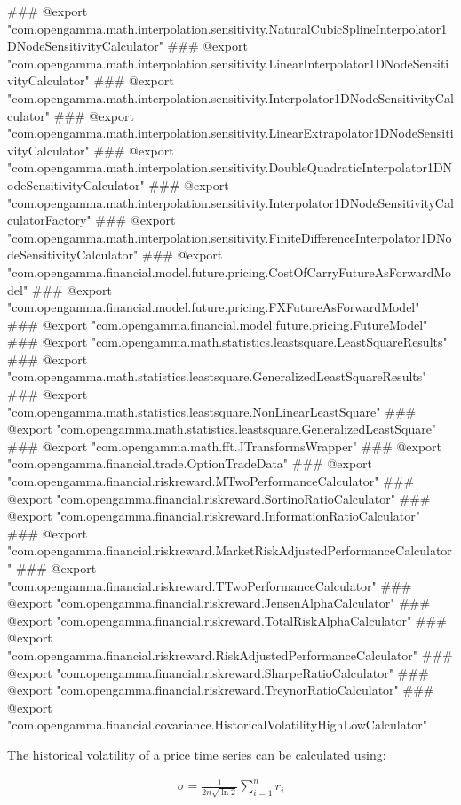 ### @export "com.opengamma.math.interpolation.sensitivity.NaturalCubicSplineInterpolator1DNodeSensitivityCalculator"
### @export "com.opengamma.math.interpolation.sensitivity.LinearInterpolator1DNodeSensitivityCalculator"
### @export "com.opengamma.math.interpolation.sensitivity.Interpolator1DNodeSensitivityCalculator"
### @export "com.opengamma.math.interpolation.sensitivity.LinearExtrapolator1DNodeSensitivityCalculator"
### @export "com.opengamma.math.interpolation.sensitivity.DoubleQuadraticInterpolator1DNodeSensitivityCalculator"
### @export "com.opengamma.math.interpolation.sensitivity.Interpolator1DNodeSensitivityCalculatorFactory"
### @export "com.opengamma.math.interpolation.sensitivity.FiniteDifferenceInterpolator1DNodeSensitivityCalculator"
### @export "com.opengamma.financial.model.future.pricing.CostOfCarryFutureAsForwardModel"
### @export "com.opengamma.financial.model.future.pricing.FXFutureAsForwardModel"
### @export "com.opengamma.financial.model.future.pricing.FutureModel"
### @export "com.opengamma.math.statistics.leastsquare.LeastSquareResults"
### @export "com.opengamma.math.statistics.leastsquare.GeneralizedLeastSquareResults"
### @export "com.opengamma.math.statistics.leastsquare.NonLinearLeastSquare"
### @export "com.opengamma.math.statistics.leastsquare.GeneralizedLeastSquare"
### @export "com.opengamma.math.fft.JTransformsWrapper"
### @export "com.opengamma.financial.trade.OptionTradeData"
### @export "com.opengamma.financial.riskreward.MTwoPerformanceCalculator"
### @export "com.opengamma.financial.riskreward.SortinoRatioCalculator"
### @export "com.opengamma.financial.riskreward.InformationRatioCalculator"
### @export "com.opengamma.financial.riskreward.MarketRiskAdjustedPerformanceCalculator"
### @export "com.opengamma.financial.riskreward.TTwoPerformanceCalculator"
### @export "com.opengamma.financial.riskreward.JensenAlphaCalculator"
### @export "com.opengamma.financial.riskreward.TotalRiskAlphaCalculator"
### @export "com.opengamma.financial.riskreward.RiskAdjustedPerformanceCalculator"
### @export "com.opengamma.financial.riskreward.SharpeRatioCalculator"
### @export "com.opengamma.financial.riskreward.TreynorRatioCalculator"
### @export "com.opengamma.financial.covariance.HistoricalVolatilityHighLowCalculator"

The historical volatility of a price time series can be calculated using:

\begin{eqnarray*}
\sigma = \frac{1}{{2 n \sqrt{\ln{2}}}}\sum\limits_{i=1}^n r_i
\end{eqnarray*}

